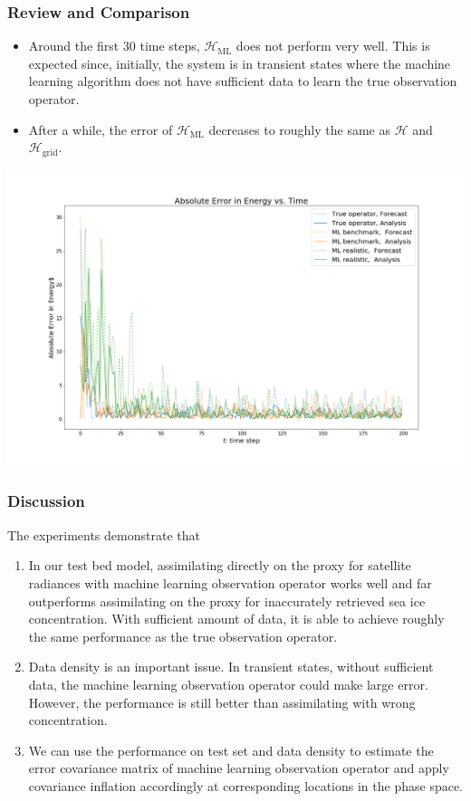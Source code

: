 \documentclass{beamer}
\newcommand{\cH}{\mathcal{H}}
\begin{document}
\begin{frame}
\frametitle{Review and Comparison}
\scriptsize{
\begin{itemize}
	\item Around the first 30 time steps, $\cH_{\text{ML}}$ does not perform very well. This is expected since, initially, the system is in transient states where the machine learning algorithm does not have sufficient data to learn the true observation operator.
	\item After a while, the error of $\cH_{\text{ML}}$ decreases to roughly the same as $\cH$ and $\cH_{\text{grid}}$.
\end{itemize}
}
\centering
\includegraphics[width=0.9\linewidth]{Figures/AbsoluteError_E_2.png}
\end{frame}

\begin{frame}
\frametitle{Discussion}
The experiments demonstrate that
\begin{enumerate}
	\item In our test bed model, assimilating directly on the proxy for satellite radiances with machine learning observation operator works well and far outperforms assimilating on the proxy for inaccurately retrieved sea ice concentration. With sufficient amount of data, it is able to achieve roughly the same performance as the true observation operator.
	\item Data density is an important issue. In transient states, without sufficient data, the machine learning observation operator could make large error. However, the performance is still better than assimilating with wrong concentration.
	\item We can use the performance on test set and data density to estimate the error covariance matrix of machine learning observation operator and apply covariance inflation accordingly at corresponding locations in the phase space.
\end{enumerate}
\end{frame}
\end{document}
